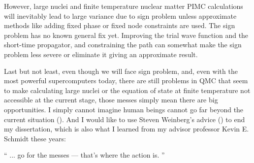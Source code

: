 \documentclass[12pt,letterpaper,UTF8]{report}
\begin{document}
However, large nuclei and finite temperature nuclear matter PIMC calculations will inevitably lead to large variance due to sign problem unless approximate methods like adding fixed phase or fixed node constraints are used.
The sign problem has no known general fix yet.
Improving the trial wave function and the short-time propagator, and constraining the path can somewhat make the sign problem less severe or eliminate it giving an approximate result.

Last but not least, even though we will face sign problem, and, even with the most powerful supercomputers today, there are still problems in QMC that seem to make calculating large nuclei or the equation of state at finite temperature not accessible at the current stage, those messes simply mean there are big opportunities.
I simply cannot imagine human beings cannot go far beyond the current situation (\cite{Laughlin2000}).
And I would like to use Steven Weinberg's advice (\cite{Weinberg2003}) to end my dissertation, which is also what I learned from my advisor professor Kevin E. Schmidt these years:

`` ... go for the messes --- that's where the action is. ''
\end{document}
